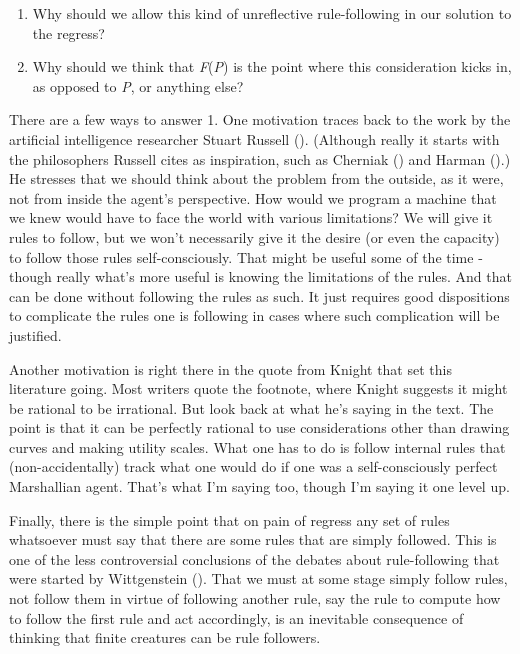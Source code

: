 \documentclass[
  11pt,
  letterpaper,
  DIV=11,
  numbers=noendperiod,
  twoside]{scrartcl}
\providecommand{\tightlist}{%
  \setlength{\itemsep}{0pt}\setlength{\parskip}{0pt}}\usepackage{longtable,booktabs,array}
\begin{document}
\begin{enumerate}
\def\labelenumi{\arabic{enumi}.}
\tightlist
\item
  Why should we allow this kind of unreflective rule-following in our
  solution to the regress?
\item
  Why should we think that \emph{F}(\emph{P}) is the point where this
  consideration kicks in, as opposed to \emph{P}, or anything else?
\end{enumerate}

There are a few ways to answer 1. One motivation traces back to the work
by the artificial intelligence researcher Stuart Russell
(). (Although really it starts with the
philosophers Russell cites as inspiration, such as Cherniak
() and Harman
().) He stresses that we should think
about the problem from the outside, as it were, not from inside the
agent's perspective. How would we program a machine that we knew would
have to face the world with various limitations? We will give it rules
to follow, but we won't necessarily give it the desire (or even the
capacity) to follow those rules self-consciously. That might be useful
some of the time - though really what's more useful is knowing the
limitations of the rules. And that can be done without following the
rules as such. It just requires good dispositions to complicate the
rules one is following in cases where such complication will be
justified.

Another motivation is right there in the quote from Knight that set this
literature going. Most writers quote the footnote, where Knight suggests
it might be rational to be irrational. But look back at what he's saying
in the text. The point is that it can be perfectly rational to use
considerations other than drawing curves and making utility scales. What
one has to do is follow internal rules that (non-accidentally) track
what one would do if one was a self-consciously perfect Marshallian
agent. That's what I'm saying too, though I'm saying it one level up.

Finally, there is the simple point that on pain of regress any set of
rules whatsoever must say that there are some rules that are simply
followed. This is one of the less controversial conclusions of the
debates about rule-following that were started by Wittgenstein
(). That we must at some stage
simply follow rules, not follow them in virtue of following another
rule, say the rule to compute how to follow the first rule and act
accordingly, is an inevitable consequence of thinking that finite
creatures can be rule followers.
\end{document}
